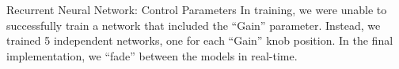 \begin{frame}{Recurrent Neural Network: Control Parameters}
    In training, we were unable to successfully train a network that
    included the ``Gain'' parameter.\newline\newline
    Instead, we trained 5 independent networks, one for each ``Gain''
    knob position. In the final implementation, we ``fade'' between the
    models in real-time.
\end{frame}
